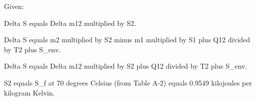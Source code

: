 Given:  

Delta S equals Delta m12 multiplied by S2.  

Delta S equals m2 multiplied by S2 minus m1 multiplied by S1 plus Q12 divided by T2 plus S_env.  

Delta S equals Delta m12 multiplied by S2 plus Q12 divided by T2 plus S_env.  

S2 equals S_f at 70 degrees Celsius (from Table A-2) equals 0.9549 kilojoules per kilogram Kelvin.